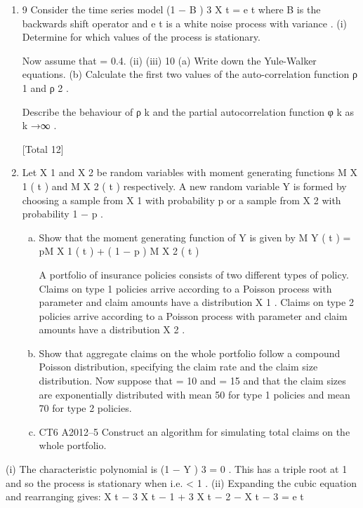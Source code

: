 \documentclass[a4paper,12pt]{article}
\begin{document}
\begin{enumerate}
\item 9
Consider the time series model
(1 − \alpha B ) 3 X t = e t
where B is the backwards shift operator and e t is a white noise process with variance
 .
(i)
Determine for which values of \alpha the process is stationary.

Now assume that \alpha = 0.4.
(ii)
(iii)
10
(a) Write down the Yule-Walker equations.
(b) Calculate the first two values of the auto-correlation function ρ 1 and
ρ 2 .

Describe the behaviour of ρ k and the partial autocorrelation function φ k as
k →∞ .

[Total 12]
\item Let X 1 and X 2 be random variables with moment generating functions M X 1 ( t ) and
M X 2 ( t ) respectively. A new random variable Y is formed by choosing a sample
from X 1 with probability p or a sample from X 2 with probability 1 − p .
\begin{enumerate}[(a)]
\item 
Show that the moment generating function of Y is given by
M Y ( t ) = pM X 1 ( t ) + ( 1 − p ) M X 2 ( t )

A portfolio of insurance policies consists of two different types of policy. Claims on
type 1 policies arrive according to a Poisson process with parameter  and claim
amounts have a distribution X 1 . Claims on type 2 policies arrive according to a
Poisson process with parameter  and claim amounts have a distribution X 2 .
\item 
Show that aggregate claims on the whole portfolio follow a compound Poisson
distribution, specifying the claim rate and the claim size distribution.
Now suppose that  = 10 and  = 15 and that the claim sizes are exponentially
distributed with mean 50 for type 1 policies and mean 70 for type 2 policies.
\item 
CT6 A2012–5
Construct an algorithm for simulating total claims on the whole portfolio. 
\end{enumerate}
\end{enumerate}
(i)
The characteristic polynomial is (1 − \alpha Y ) 3 = 0 .
This has a triple root at 1
\alpha
and so the process is stationary when
i.e. \alpha < 1 .
(ii)
Expanding the cubic equation and rearranging gives:
X t − 3 \alpha X t − 1 + 3  X t − 2 −  X t − 3 = e t
\end{document}
